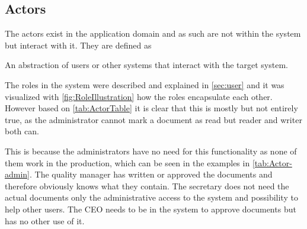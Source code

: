 \subsection{Actors}\label{sec:Actors}
The actors exist in the application domain and as such are not within the system but interact with it. They are defined as

\begin{defn}
An abstraction of users or other systems that interact with the target system. \citep[p.~121]{Rod-Aalborg}
\end{defn}

The roles in the system were described and explained in \cref{sec:user} and it was visualized with \cref{fig:RoleIllustration} how the roles encapsulate each other.
However based on \cref{tab:ActorTable} it is clear that this is mostly but not entirely true, as the administrator cannot mark a document as read but reader and writer both can.

This is because the administrators have no need for this functionality as none of them work in the production, which can be seen in the examples in \cref{tab:Actor-admin}.
The quality manager has written or approved the documents and therefore obviously knows what they contain.
The secretary does not need the actual documents only the administrative access to the system and possibility to help other users.
The CEO needs to be in the system to approve documents but has no other use of it.

